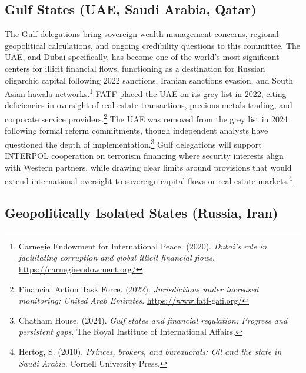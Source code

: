 \subsection{Gulf States (UAE, Saudi Arabia, Qatar)}

The Gulf delegations bring sovereign wealth management concerns, regional geopolitical calculations, and ongoing credibility questions to this committee. The UAE, and Dubai specifically, has become one of the world's most significant centers for illicit financial flows, functioning as a destination for Russian oligarchic capital following 2022 sanctions, Iranian sanctions evasion, and South Asian hawala networks.\footnote{Carnegie Endowment for International Peace. (2020). \emph{Dubai's role in facilitating corruption and global illicit financial flows}. \url{https://carnegieendowment.org/}} FATF placed the UAE on its grey list in 2022, citing deficiencies in oversight of real estate transactions, precious metals trading, and corporate service providers.\footnote{Financial Action Task Force. (2022). \emph{Jurisdictions under increased monitoring: United Arab Emirates}. \url{https://www.fatf-gafi.org/}} The UAE was removed from the grey list in 2024 following formal reform commitments, though independent analysts have questioned the depth of implementation.\footnote{Chatham House. (2024). \emph{Gulf states and financial regulation: Progress and persistent gaps}. The Royal Institute of International Affairs.} Gulf delegations will support INTERPOL cooperation on terrorism financing where security interests align with Western partners, while drawing clear limits around provisions that would extend international oversight to sovereign capital flows or real estate markets.\footnote{Hertog, S. (2010). \emph{Princes, brokers, and bureaucrats: Oil and the state in Saudi Arabia}. Cornell University Press.}

\subsection{Geopolitically Isolated States (Russia, Iran)}

